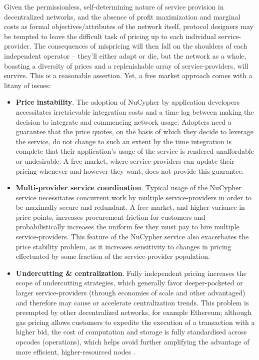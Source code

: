 \documentclass[longbibliography,nofootinbib]{revtex4-1}
\begin{document}
Given the permissionless, self-determining nature of service provision in decentralized networks, and the absence of profit maximization and marginal costs as formal objectives/attributes of the network itself, protocol designers may be tempted to leave the difficult task of pricing up to each individual service-provider. The consequences of mispricing will then fall on the shoulders of each independent operator – they’ll either adapt or die, but the network as a whole, boasting a diversity of prices and a replenishable array of service-providers, will survive. This is a reasonable assertion. Yet, a free market approach comes with a litany of issues: 
\begin{itemize}
    \item \textbf{Price instability}. The adoption of NuCypher by application developers necessitates irretrievable integration costs and a time lag between making the decision to integrate and commencing network usage. Adopters need a guarantee that the price quotes, on the basis of which they decide to leverage the service, do not change to such an extent by the time integration is complete that their application’s usage of the service is rendered unaffordable or undesirable. A free market, where service-providers can update their pricing whenever and however they want, does not provide this guarantee. 
    \item \textbf{Multi-provider service coordination}. Typical usage of the NuCypher service necessitates concurrent work by multiple service-providers in order to be maximally secure and redundant. A free market, and higher variance in price points, increases procurement friction for customers and probabilistically increases the uniform fee they must pay to hire multiple service-providers. This feature of the NuCypher service also exacerbates the price stability problem, as it increases sensitivity to changes in pricing effectuated by some fraction of the service-provider population.
    \item \textbf{Undercutting \& centralization}.  Fully independent pricing increases the scope of undercutting strategies, which generally favor deeper-pocketed or larger service-providers (through economies of scale and other advantaged) and therefore may cause or accelerate centralization trends. This problem is preempted by other decentralized networks, for example Ethereum; although gas pricing allows customers to expedite the execution of a transaction with a higher bid, the cost of computation and storage is fully standardised across opcodes (operations), which helps avoid further amplifying the advantage of more efficient, higher-resourced nodes \cite{ethgas}. 

\end{itemize}
\end{document}
